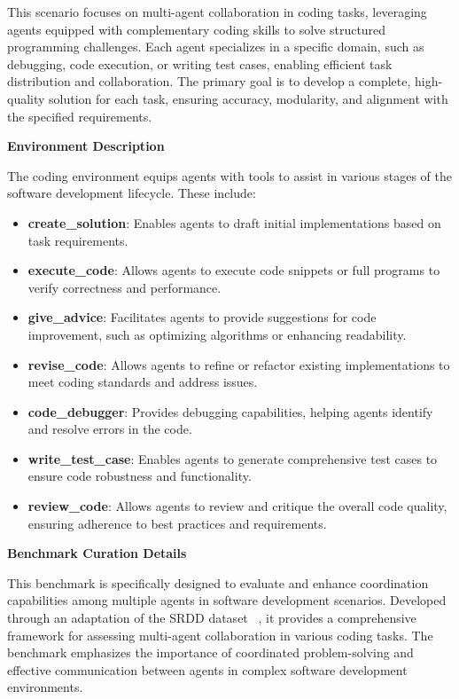 This scenario focuses on multi-agent collaboration in coding tasks, leveraging agents equipped with complementary coding skills to solve structured programming challenges. Each agent specializes in a specific domain, such as debugging, code execution, or writing test cases, enabling efficient task distribution and collaboration. The primary goal is to develop a complete, high-quality solution for each task, ensuring accuracy, modularity, and alignment with the specified requirements.

\textbf{Environment Description}

The coding environment equips agents with tools to assist in various stages of the software development lifecycle. These include:

\begin{itemize}
    \item \textbf{create\_solution}: Enables agents to draft initial implementations based on task requirements.
    \item \textbf{execute\_code}: Allows agents to execute code snippets or full programs to verify correctness and performance.
    \item \textbf{give\_advice}: Facilitates agents to provide suggestions for code improvement, such as optimizing algorithms or enhancing readability.
    \item \textbf{revise\_code}: Allows agents to refine or refactor existing implementations to meet coding standards and address issues.
    \item \textbf{code\_debugger}: Provides debugging capabilities, helping agents identify and resolve errors in the code.
    \item \textbf{write\_test\_case}: Enables agents to generate comprehensive test cases to ensure code robustness and functionality.
    \item \textbf{review\_code}: Allows agents to review and critique the overall code quality, ensuring adherence to best practices and requirements.
\end{itemize}

\textbf{Benchmark Curation Details}

This benchmark is specifically designed to evaluate and enhance coordination capabilities among multiple agents in software development scenarios. Developed through an adaptation of the SRDD dataset ~\citep{Li2023ChatDev}, it provides a comprehensive framework for assessing multi-agent collaboration in various coding tasks. The benchmark emphasizes the importance of coordinated problem-solving and effective communication between agents in complex software development environments.

